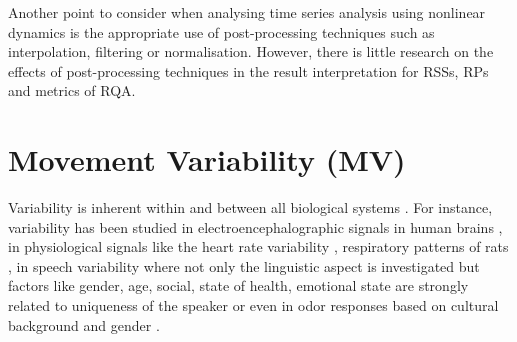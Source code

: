 Another point to consider when analysing time series analysis using nonlinear dynamics
is the appropriate use of post-processing techniques such as 
interpolation, filtering or normalisation.
However, there is little research on the effects of post-processing techniques 
in the result interpretation for  RSSs, RPs and metrics of RQA.

%






\section{Movement Variability (MV)}
Variability is inherent within and between all biological systems \citep{newell1993}.
For instance, variability has been studied in electroencephalographic 
signals in human brains \citep{klonowski2007}, in physiological signals like the heart 
rate variability \citep{schumacher2004, acharya2006}, respiratory patterns of rats \citep{dhingra2011}, 
in speech variability where not only the linguistic aspect is investigated but 
factors like gender, age, social, state of health, emotional state are
strongly related to uniqueness of the speaker \citep{benzeghiba2007}
or even in odor responses based on cultural background and gender \citep{ferdenzi2013}.

